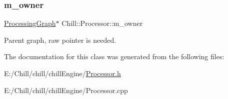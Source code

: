 \subsubsection{\texorpdfstring{m\+\_\+owner}{m\_owner}}
{\footnotesize\ttfamily \mbox{\hyperlink{class_chill_1_1_processing_graph}{Processing\+Graph}}$\ast$ Chill\+::\+Processor\+::m\+\_\+owner\hspace{0.3cm}{\ttfamily [protected]}}

Parent graph, raw pointer is needed. 

The documentation for this class was generated from the following files\+:\begin{DoxyCompactItemize}
\item 
E\+:/\+Chill/chill/chill\+Engine/\mbox{\hyperlink{_processor_8h}{Processor.\+h}}\item 
E\+:/\+Chill/chill/chill\+Engine/Processor.\+cpp\end{DoxyCompactItemize}
